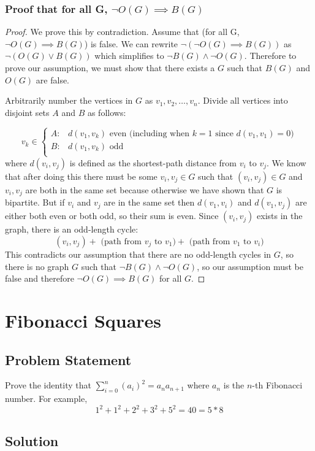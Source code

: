 \documentclass[12pt]{article}
\newcommand{\ProblemStatement}[1]{
\subsection*{Problem Statement}
#1
\subsection*{Solution}
}
\begin{document}
\subsubsection*{Proof that for all G, $\neg O(G) \implies B(G)$}
\begin{proof}
We prove this by contradiction. Assume that (for all G, $\neg O(G) \implies B(G)$) is false. We can rewrite $\neg(\neg O(G)\implies B(G))$ as $\neg(O(G) \vee B(G))$  which simplifies to $\neg B(G) \wedge \neg O(G)$. Therefore to prove our assumption, we must show that there exists a $G$ such that $B(G)$ and $O(G)$ are false.

Arbitrarily number the vertices in $G$ as $v_1, v_2, \ldots, v_n$. Divide all vertices into disjoint sets $A$ and $B$ as follows:
    
    \[
    v_k \in 
    \begin{cases} 
      A:& d(v_1, v_k) \text{ even (including when } k = 1 \text{ since }d(v_1, v_1) = 0)\\
      B:& d(v_1, v_k) \text{ odd}\\
    \end{cases}
    \]    
    where $d(v_i, v_j)$ is defined as the shortest-path distance from $v_i$ to $v_j$. We know that after doing this there must be some $v_i, v_j \in G$ such that $(v_i, v_j) \in G$ and $v_i, v_j$ are both in the same set because otherwise we have shown that $G$ is bipartite. But if $v_i$ and $v_j$ are in the same set then $d(v_1, v_i)$ and $d(v_1, v_j)$ are either both even or both odd, so their sum is even. Since $(v_i, v_j)$ exists in the graph, there is an odd-length cycle: 
    \[
        (v_i, v_j) + \text{ (path from } v_j \text{ to } v_1) + \text{ (path from } v_1 \text{ to } v_i)
    \]
    This contradicts our assumption that there are no odd-length cycles in $G$, so there is no graph $G$ such that $\neg B(G) \wedge \neg O(G)$, so our assumption must be false and therefore $\neg O(G) \implies B(G)$ for all $G$.
\end{proof}


\section{Fibonacci Squares}
\ProblemStatement{
Prove the identity that $\sum_{i=0}^{n} (a_i)^2 = a_na_{n+1}$ where $a_n$ is the $n$-th Fibonacci number. For example, \[
    1^2 + 1^2 + 2^2 + 3^2 + 5^2 = 40 = 5 * 8
\]
}
\end{document}
